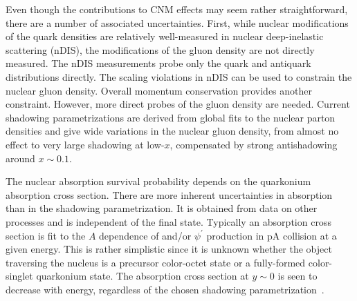 Even though the contributions to CNM effects may 
seem rather straightforward, there are a number of associated uncertainties. 
First, while nuclear modifications of the quark densities are relatively 
well-measured in nuclear deep-inelastic scattering (nDIS), the modifications of the 
gluon density are not directly measured. The nDIS measurements probe only the 
quark and antiquark distributions directly. The scaling violations in nDIS can 
be used to constrain the nuclear gluon density. Overall momentum conservation 
provides another constraint. However, more direct probes of the gluon 
density are needed. Current shadowing parametrizations are derived from 
global fits to the nuclear parton densities and
give wide variations in the nuclear gluon 
density, from almost no effect to very large shadowing at low-$x$, 
compensated 
by strong antishadowing around $x \sim 0.1$.  




The nuclear absorption survival probability depends on the quarkonium 
absorption cross section. There are more inherent uncertainties 
in absorption than in the shadowing parametrization. It is obtained 
from data on other processes and is independent of the final 
state. Typically an absorption cross section is fit to the $A$ dependence 
of \jpsi and/or $\psi^{'}$ production in pA collision at a given energy. 
This is rather simplistic since it is unknown whether the object traversing the nucleus is a precursor 
color-octet state or a fully-formed color-singlet quarkonium state. The \jpsi absorption cross 
section at $y \sim 0$ is seen to decrease with energy, regardless of the chosen shadowing 
parametrization~\cite{Lourenco:2008sk}. 


